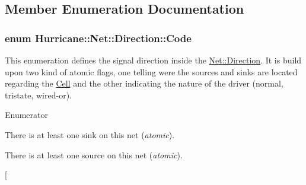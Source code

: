 \subsection{Member Enumeration Documentation}
\hypertarget{classHurricane_1_1Net_1_1Direction_a5b34d7c3ac52628861af3a46f781fae4}{
\subsubsection[{Code}]{\setlength{\rightskip}{0pt plus 5cm}enum {\bf Hurricane\-::\-Net\-::\-Direction\-::\-Code}}}\label{classHurricane_1_1Net_1_1Direction_a5b34d7c3ac52628861af3a46f781fae4}
This enumeration defines the signal direction inside the \hyperlink{classHurricane_1_1Net_1_1Direction}{Net\-::\-Direction}. It is build upon two kind of atomic flags, one telling were the sources and sinks are located regarding the \hyperlink{classHurricane_1_1Cell}{Cell} and the other indicating the nature of the driver (normal, tristate, wired-\/or). \begin{Desc}
\item[Enumerator]\par
\begin{description}
\item[{\em 
\hypertarget{classHurricane_1_1Net_1_1Direction_a5b34d7c3ac52628861af3a46f781fae4a36971421023586a2b5b019f468d699ba}{Dir\-In}\label{classHurricane_1_1Net_1_1Direction_a5b34d7c3ac52628861af3a46f781fae4a36971421023586a2b5b019f468d699ba}
}]There is at least one sink on this net ({\itshape atomic}). \item[{\em 
\hypertarget{classHurricane_1_1Net_1_1Direction_a5b34d7c3ac52628861af3a46f781fae4a1135f8c6a05d3801c43684bc195f66f0}{Dir\-Out}\label{classHurricane_1_1Net_1_1Direction_a5b34d7c3ac52628861af3a46f781fae4a1135f8c6a05d3801c43684bc195f66f0}
}]There is at least one source on this net ({\itshape atomic}). \item[{\em 
}
\end{description}
\end{Desc}
